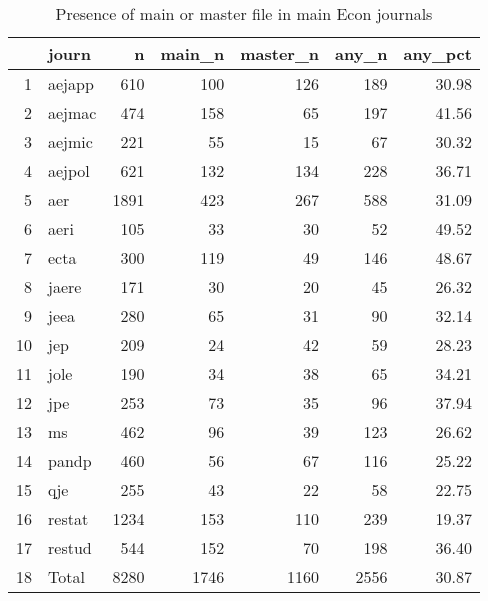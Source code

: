 \begin{table}[ht]
\centering
\caption{Presence of main or master file in main Econ journals} 
\label{tab:master:byjournal}
\begin{tabular}{rlrrrrr}
  \hline
 & journ & n & main\_n & master\_n & any\_n & any\_pct \\ 
  \hline
1 & aejapp & 610 & 100 & 126 & 189 & 30.98 \\ 
  2 & aejmac & 474 & 158 &  65 & 197 & 41.56 \\ 
  3 & aejmic & 221 &  55 &  15 &  67 & 30.32 \\ 
  4 & aejpol & 621 & 132 & 134 & 228 & 36.71 \\ 
  5 & aer & 1891 & 423 & 267 & 588 & 31.09 \\ 
  6 & aeri & 105 &  33 &  30 &  52 & 49.52 \\ 
  7 & ecta & 300 & 119 &  49 & 146 & 48.67 \\ 
  8 & jaere & 171 &  30 &  20 &  45 & 26.32 \\ 
  9 & jeea & 280 &  65 &  31 &  90 & 32.14 \\ 
  10 & jep & 209 &  24 &  42 &  59 & 28.23 \\ 
  11 & jole & 190 &  34 &  38 &  65 & 34.21 \\ 
  12 & jpe & 253 &  73 &  35 &  96 & 37.94 \\ 
  13 & ms & 462 &  96 &  39 & 123 & 26.62 \\ 
  14 & pandp & 460 &  56 &  67 & 116 & 25.22 \\ 
  15 & qje & 255 &  43 &  22 &  58 & 22.75 \\ 
  16 & restat & 1234 & 153 & 110 & 239 & 19.37 \\ 
  17 & restud & 544 & 152 &  70 & 198 & 36.40 \\ 
  18 & Total & 8280 & 1746 & 1160 & 2556 & 30.87 \\ 
   \hline
\end{tabular}
\end{table}
